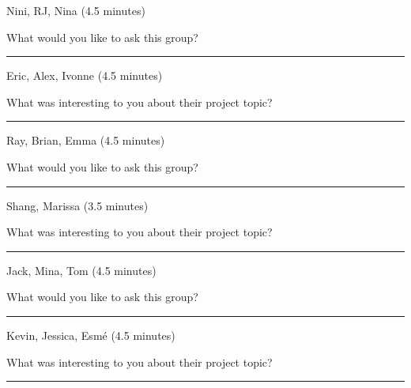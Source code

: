 \documentclass[12pt,letterpaper,noanswers]{exam}
\begin{document}
 
 \noindent Nini, RJ, Nina (4.5 minutes)
 
   \noindent What would you like to ask this group?

\vfill
 
 \hrule
 \vspace{0.1cm}

 
 \noindent Eric, Alex, Ivonne (4.5 minutes)
 
  \noindent What was interesting to you about their project topic?
\vfill

 
    \hrule
  \vspace{0.1cm}

\noindent Ray, Brian, Emma (4.5 minutes)

   \noindent What would you like to ask this group?


\vfill
 
 \hrule
  \vspace{0.1cm}
 

 \noindent Shang, Marissa (3.5 minutes)

  \noindent What was interesting to you about their project topic?
\vfill 
 
 \hrule
  \vspace{0.1cm}

 
\noindent Jack, Mina, Tom (4.5 minutes)

   \noindent What would you like to ask this group?


\vfill
 
 \hrule
  \vspace{0.1cm}


\noindent Kevin, Jessica, Esmé (4.5 minutes)

  \noindent What was interesting to you about their project topic?

\vfill
 
 \hrule
  \vspace{0.1cm}
\end{document}
